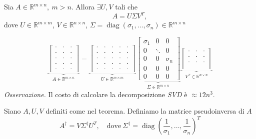 \begin{theorem}
    Sia $A\in\mathbb R^{m\times n},\ m>n$. Allora $\exists U,V$ tali che 
    \[
    A = U\Sigma V^T,
    \]
    dove $U\in \mathbb R^{m\times m}$, $V\in \mathbb R^{n\times n}$, $\Sigma=\operatorname{diag}(\sigma_1,\dots,\sigma_n)\in \mathbb R^{m\times n}$
\end{theorem}

\begin{equation*}
\underbrace{\begin{bmatrix}
\cdot  & \cdot  & \cdot \\
\cdot  & \cdot  & \cdot \\
\cdot  & \cdot  & \cdot \\
\cdot  & \cdot  & \cdot \\
\cdot  & \cdot  & \cdot
\end{bmatrix}}_{A\in \mathbb{R}^{m\times n}} =\underbrace{\begin{bmatrix}
\cdot  & \cdot  & \cdot  & \cdot  & \cdot \\
\cdot  & \cdot  & \cdot  & \cdot  & \cdot \\
\cdot  & \cdot  & \cdot  & \cdot  & \cdot \\
\cdot  & \cdot  & \cdot  & \cdot  & \cdot \\
\cdot  & \cdot  & \cdot  & \cdot  & \cdot
\end{bmatrix}}_{U\in \mathbb{R}^{m\times m}}\underbrace{\begin{bmatrix}
\sigma_1  & 0  & 0 \\
0 & \ddots  & 0 \\
0 & 0 & \sigma_n \\
0 & 0 & 0\\
0 & 0 & 0
\end{bmatrix}}_{\Sigma\in \mathbb{R}^{m\times n}}
\underbrace{\begin{bmatrix}
    \cdot  & \cdot  & \cdot \\
    \cdot  & \cdot  & \cdot \\
    \cdot  & \cdot  & \cdot \\
\end{bmatrix}}_{V^T\in\mathbb R^{n\times n}}
\end{equation*}
\textit{Osservazione.} Il costo di calcolare la decomposizione \textit{SVD} è $\approx 12 n^3$.

\begin{definition}
    Siano $A,U,V$ definiti come nel teorema. Definiamo la matrice pseudoinversa di $A$
    \[
    A^\dagger =V\Sigma^\dagger U^T,\quad \text{dove} \ \Sigma^\dagger =\operatorname{diag}\left(\frac1{\sigma_1},\dots,\frac1{\sigma_n}\right)^T
    \]
\end{definition}


